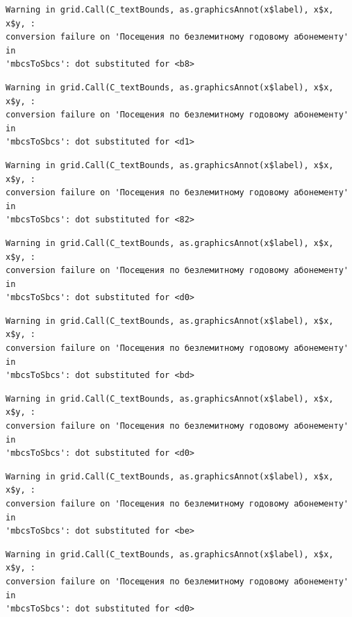 \documentclass[
  letterpaper,
  DIV=11,
  numbers=noendperiod]{scrartcl}
\begin{document}
\begin{verbatim}
Warning in grid.Call(C_textBounds, as.graphicsAnnot(x$label), x$x, x$y, :
conversion failure on 'Посещения по безлемитному годовому абонементу' in
'mbcsToSbcs': dot substituted for <b8>
\end{verbatim}

\begin{verbatim}
Warning in grid.Call(C_textBounds, as.graphicsAnnot(x$label), x$x, x$y, :
conversion failure on 'Посещения по безлемитному годовому абонементу' in
'mbcsToSbcs': dot substituted for <d1>
\end{verbatim}

\begin{verbatim}
Warning in grid.Call(C_textBounds, as.graphicsAnnot(x$label), x$x, x$y, :
conversion failure on 'Посещения по безлемитному годовому абонементу' in
'mbcsToSbcs': dot substituted for <82>
\end{verbatim}

\begin{verbatim}
Warning in grid.Call(C_textBounds, as.graphicsAnnot(x$label), x$x, x$y, :
conversion failure on 'Посещения по безлемитному годовому абонементу' in
'mbcsToSbcs': dot substituted for <d0>
\end{verbatim}

\begin{verbatim}
Warning in grid.Call(C_textBounds, as.graphicsAnnot(x$label), x$x, x$y, :
conversion failure on 'Посещения по безлемитному годовому абонементу' in
'mbcsToSbcs': dot substituted for <bd>
\end{verbatim}

\begin{verbatim}
Warning in grid.Call(C_textBounds, as.graphicsAnnot(x$label), x$x, x$y, :
conversion failure on 'Посещения по безлемитному годовому абонементу' in
'mbcsToSbcs': dot substituted for <d0>
\end{verbatim}

\begin{verbatim}
Warning in grid.Call(C_textBounds, as.graphicsAnnot(x$label), x$x, x$y, :
conversion failure on 'Посещения по безлемитному годовому абонементу' in
'mbcsToSbcs': dot substituted for <be>
\end{verbatim}

\begin{verbatim}
Warning in grid.Call(C_textBounds, as.graphicsAnnot(x$label), x$x, x$y, :
conversion failure on 'Посещения по безлемитному годовому абонементу' in
'mbcsToSbcs': dot substituted for <d0>
\end{verbatim}
\end{document}
